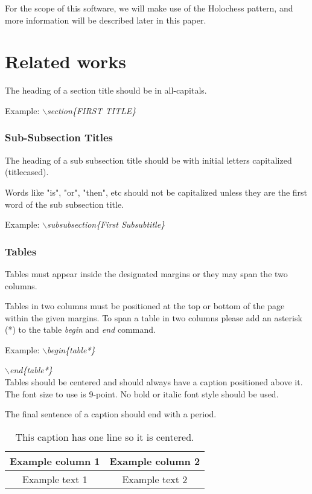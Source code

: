 \documentclass[a4paper,twoside]{article}
\begin{document}
For the scope of this software, we will make use of the Holochess pattern, and more information will be described later in this paper.
\section{Related works}

The heading of a section title should be in all-capitals.

Example: \textit{$\backslash$section\{FIRST TITLE\}}
\noindent 

\subsubsection{Sub-Subsection Titles}

The heading of a sub subsection title should be with initial letters
capitalized (titlecased).

Words like "is", "or", "then", etc should not be capitalized unless
they are the first word of the sub subsection title.

Example: \textit{$\backslash$subsubsection\{First Subsubtitle\}}

\subsubsection{Tables}

Tables must appear inside the designated margins or they may span
the two columns.

Tables in two columns must be positioned at the top or bottom of the
page within the given margins. To span a table in two columns please add an asterisk (*) to the table \textit{begin} and \textit{end} command.

Example: \textit{$\backslash$begin\{table*\}}

\hspace*{1.5cm}\textit{$\backslash$end\{table*\}}\\

Tables should be centered and should always have a caption
positioned above it. The font size to use is 9-point. No bold or
italic font style should be used.

The final sentence of a caption should end with a period.

\begin{table}[h]
\caption{This caption has one line so it is
centered.}\label{tab:example1} \centering
\begin{tabular}{|c|c|}
  \hline
  Example column 1 & Example column 2 \\
  \hline
  Example text 1 & Example text 2 \\
  \hline
\end{tabular}
\end{table}
\end{document}
